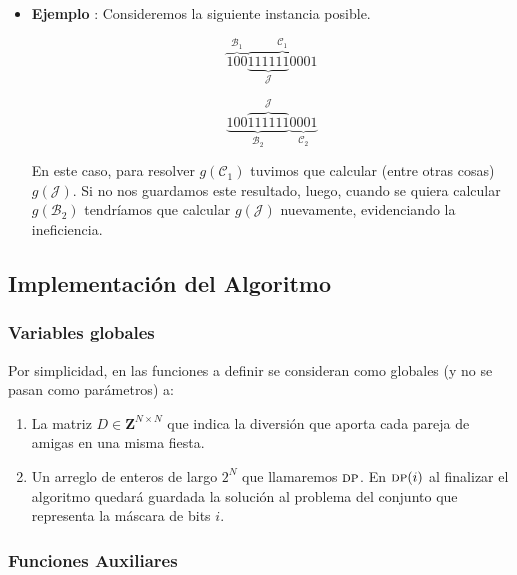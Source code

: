 \begin{itemize}
	\item \textbf{Ejemplo} : Consideremos la siguiente instancia posible.
	
	 $$\overset{\mathcal{B}_1}{\overbrace{100}} \overset{\mathcal{C}_1}{\overbrace{\underset{\mathcal{J}}{\underbrace{111111}}0001}}$$
	
	$$\underset{\mathcal{B}_2}{\underbrace{100\overset{\mathcal{J}}{\overbrace{111111}}}}\underset{\mathcal{C}_2}{\underbrace{0001}}$$
	
	En este caso, para resolver $g(\mathcal{C}_1)$ tuvimos que calcular (entre otras cosas) $g(\mathcal{J})$. Si no nos guardamos este resultado, luego, cuando se quiera calcular $g(\mathcal{B}_2)$ tendríamos que calcular $g(\mathcal{J})$ nuevamente, evidenciando la ineficiencia.
\end{itemize} 

\subsection{Implementación del Algoritmo}

\subsubsection{Variables globales}

Por simplicidad, en las funciones a definir se consideran como globales (y no se pasan como parámetros) a:

\begin{enumerate}

	\item La matriz $D \in \mathbf{Z}^{N \times N}$ que indica la diversión que aporta cada pareja de amigas en una misma fiesta.
	\item Un arreglo de enteros de largo $2^N$ que llamaremos $\textsc{dp}$. En $\textsc{dp}(i)$ al finalizar el algoritmo quedará guardada la solución al problema del conjunto que representa la máscara de bits $i$.
\end{enumerate}  

\subsubsection{Funciones Auxiliares}

